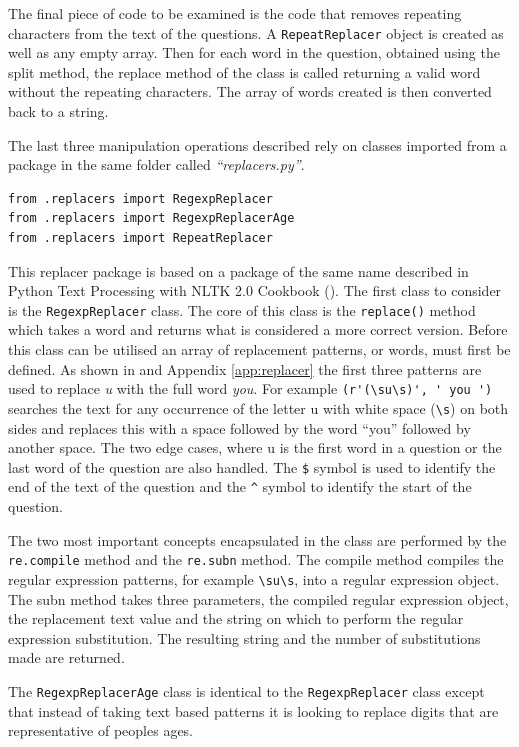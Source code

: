 The final piece of code to be examined is the code that removes repeating characters from the text of the questions. A \verb|RepeatReplacer| object is created as well as any empty array. Then for each word in the question, obtained using the split method, the replace method of the class is called returning a valid word without the repeating characters. The array of words created is then converted back to a string. 

The last three manipulation operations described rely on classes imported from a package in the same folder called \textit{``replacers.py''}. 

\begin{lstlisting}[]
from .replacers import RegexpReplacer
from .replacers import RegexpReplacerAge
from .replacers import RepeatReplacer
\end{lstlisting}

This replacer package is based on a package of the same name described in Python Text Processing with NLTK 2.0 Cookbook (\citet{perkins_python_2010}). The first class to consider is the \verb|RegexpReplacer| class. The core of this class is the \verb|replace()| method which takes a word and returns what is considered a more correct version. Before this class can be utilised an array of replacement patterns, or words, must first be defined. As shown in and Appendix \ref{app:replacer} the first three patterns are used to replace \textit{u} with the full word \textit{you}. For example \verb|(r'(\su\s)', ' you ')| searches the text for any occurrence of the letter u with white space (\verb|\s|) on both sides and replaces this with a space followed by the word ``you'' followed by another space. The two edge cases, where u is the first word in a question or the last word of the question are also handled. The \verb|$| symbol is used to identify the end of the text of the question and the \verb|^| symbol to identify the start of the question. 

The two most important concepts encapsulated in the class are performed by the \verb|re.compile| method and the \verb|re.subn| method. The compile method compiles the regular expression patterns, for example \verb|\su\s|, into a regular expression object. The subn method takes three parameters, the compiled regular expression object, the replacement text value and the string on which to perform the regular expression substitution. The resulting string and the number of substitutions made are returned. 

The \verb|RegexpReplacerAge| class is identical to the \verb|RegexpReplacer| class except that instead of taking text based patterns it is looking to replace digits that are representative of peoples ages. 

